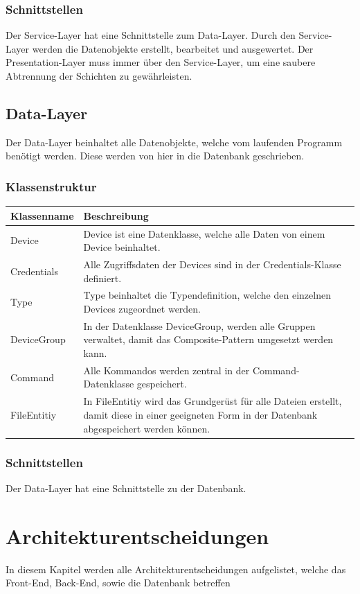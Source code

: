 \subsubsection{Schnittstellen}
Der Service-Layer hat eine Schnittstelle zum Data-Layer. Durch den Service-Layer werden die Datenobjekte erstellt, bearbeitet und ausgewertet. Der Presentation-Layer muss immer über den Service-Layer, um eine saubere Abtrennung der Schichten zu gewährleisten.

\subsection{Data-Layer}
Der Data-Layer beinhaltet alle Datenobjekte, welche vom laufenden Programm benötigt werden. Diese werden von hier in die Datenbank geschrieben.
\subsubsection{Klassenstruktur}
\begin{table}[H]
\centering
    \begin{tabular}{@{}l p{11cm} @{}}\toprule    
    {Klassenname} & {Beschreibung}\\ \midrule
    Device & Device ist eine Datenklasse, welche alle Daten von einem Device beinhaltet.\\
    Credentials & Alle Zugriffsdaten der Devices sind in der Credentials-Klasse definiert. \\
    Type & Type beinhaltet die Typendefinition, welche den einzelnen Devices zugeordnet werden. \\
    DeviceGroup & In der Datenklasse DeviceGroup, werden alle Gruppen verwaltet, damit das Composite-Pattern umgesetzt werden kann.\\
    Command & Alle Kommandos werden zentral in der Command-Datenklasse gespeichert.\\
    FileEntitiy & In FileEntitiy wird das Grundgerüst für alle Dateien erstellt, damit diese in einer geeigneten Form in der Datenbank abgespeichert werden können.\\ 
    \bottomrule
    \end{tabular}
\end{table}
\subsubsection{Schnittstellen}
Der Data-Layer hat eine Schnittstelle zu der Datenbank.

\section{Architekturentscheidungen}
In diesem Kapitel werden alle Architekturentscheidungen aufgelistet, welche das Front-End, Back-End, sowie die Datenbank betreffen
